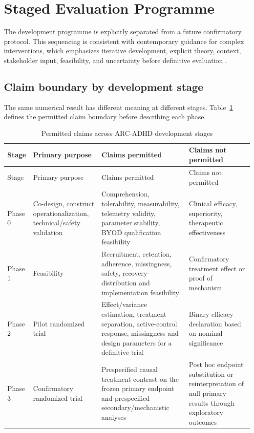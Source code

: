 \section{Staged Evaluation Programme}

The development programme is explicitly separated from a future confirmatory protocol. This sequencing is consistent with contemporary guidance for complex interventions, which emphasizes iterative development, explicit theory, context, stakeholder input, feasibility, and uncertainty before definitive evaluation \parencite{skivington2021complex}.



\subsection{Claim boundary by development stage}

The same numerical result has different meaning at different stages. Table~\ref{tab:stage-claims} defines the permitted claim boundary before describing each phase.

\begingroup
\small
\setlength{\LTpre}{6pt}
\setlength{\LTpost}{6pt}
\renewcommand{\arraystretch}{1.1}
\begin{longtable}{p{1.8cm}p{3.0cm}p{3.6cm}p{3.6cm}}
\caption{Permitted claims across ARC-ADHD development stages}\label{tab:stage-claims}\\
\toprule
Stage & Primary purpose & Claims permitted & Claims not permitted \\

\midrule
\endfirsthead
\toprule
Stage & Primary purpose & Claims permitted & Claims not permitted \\

\midrule
\endhead
\midrule
\endfoot
\bottomrule
\endlastfoot
Phase 0 & Co-design, construct operationalization, technical/safety validation & Comprehension, tolerability, measurability, telemetry validity, parameter stability, BYOD qualification feasibility & Clinical efficacy, superiority, therapeutic effectiveness \\
Phase 1 & Feasibility & Recruitment, retention, adherence, missingness, safety, recovery-distribution and implementation feasibility & Confirmatory treatment effect or proof of mechanism \\
Phase 2 & Pilot randomized trial & Effect/variance estimation, treatment separation, active-control response, missingness and design parameters for a definitive trial & Binary efficacy declaration based on nominal significance \\
Phase 3 & Confirmatory randomized trial & Prespecified causal treatment contrast on the frozen primary endpoint and prespecified secondary/mechanistic analyses & Post hoc endpoint substitution or reinterpretation of null primary results through exploratory outcomes \\
\end{longtable}
\endgroup


